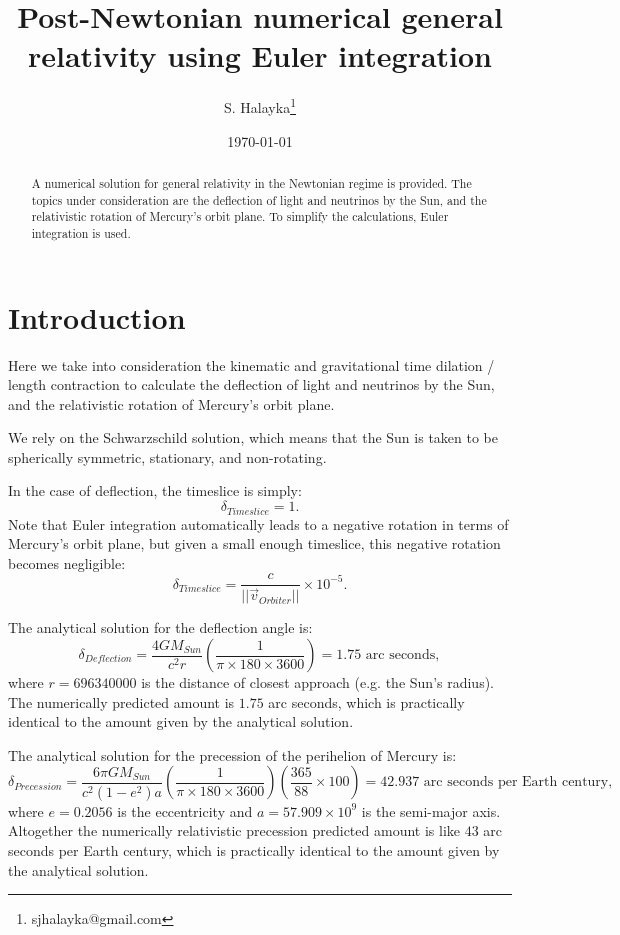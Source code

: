 \documentclass[12pt]{article}
\title{Post-Newtonian numerical general relativity using Euler integration}
\author{S. Halayka\footnote{sjhalayka@gmail.com}}
\date{\today\;\currenttime}
\begin{document}
 
\maketitle

\begin{abstract}
A numerical solution for general relativity in the Newtonian regime is provided.
The topics under consideration are the deflection of light and neutrinos by the Sun, and the relativistic rotation of Mercury's orbit plane.
To simplify the calculations, Euler integration is used.
\end{abstract}





\section{Introduction}

Here we take into consideration the kinematic and gravitational time dilation / length contraction to calculate the deflection of light and neutrinos by the Sun, and the relativistic rotation of Mercury's orbit plane.

We rely on the Schwarzschild solution, which means that the Sun is taken to be spherically symmetric, stationary, and non-rotating.

In the case of deflection, the timeslice is simply:
\begin{equation}
\delta_{Timeslice} = 1.
\end{equation}
Note that Euler integration automatically leads to a negative rotation in terms of Mercury's orbit plane, but given a small enough timeslice, this negative rotation becomes negligible:
\begin{equation}
\delta_{Timeslice} = \frac{c}{\lvert\lvert \vec{v}_{Orbiter} \rvert \rvert} \times 10^{-5}.
\end{equation}

The analytical solution for the deflection angle is:
\begin{equation}
\delta_{Deflection} = \frac{4GM_{Sun}}{c^2 r} \left( \frac{1}{\pi \times 180 \times 3600} \right) = 1.75 \textrm{ arc seconds},
\end{equation}
where $r = 696340000$ is the distance of closest approach (e.g. the Sun's radius).
The numerically predicted amount is $1.75$ arc seconds, which is practically identical to the amount given by the analytical solution.

The analytical solution for the precession of the perihelion of Mercury is:
\begin{equation}
\delta_{Precession} = \frac{6 \pi GM_{Sun}}{c^2 (1 - e^2) a} \left( \frac{1}{ \pi \times 180 \times 3600} \right) \left( \frac{365}{88} \times 100 \right) = 42.937 \textrm{ arc seconds per Earth century},
\end{equation}
where $e = 0.2056$ is the eccentricity and $a = 57.909 \times 10^9$ is the semi-major axis.
Altogether the numerically relativistic precession predicted amount is like $43$ arc seconds per Earth century, which is practically identical to the amount given by the analytical solution.
\end{document}
